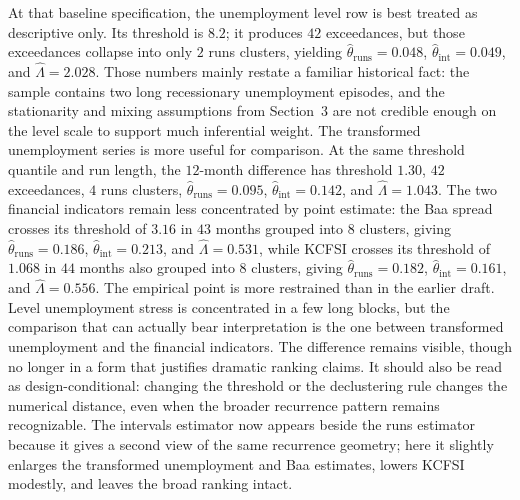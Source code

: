 \documentclass[11pt]{article}
\begin{document}
At that baseline specification, the unemployment level row is best treated as descriptive only. Its threshold is $8.2$; it produces $42$ exceedances, but those exceedances collapse into only $2$ runs clusters, yielding $\widehat{\theta}_{\mathrm{runs}}=0.048$, $\widehat{\theta}_{\mathrm{int}}=0.049$, and $\widehat{\Lambda}=2.028$. Those numbers mainly restate a familiar historical fact: the sample contains two long recessionary unemployment episodes, and the stationarity and mixing assumptions from Section~3 are not credible enough on the level scale to support much inferential weight. The transformed unemployment series is more useful for comparison. At the same threshold quantile and run length, the $12$-month difference has threshold $1.30$, $42$ exceedances, $4$ runs clusters, $\widehat{\theta}_{\mathrm{runs}}=0.095$, $\widehat{\theta}_{\mathrm{int}}=0.142$, and $\widehat{\Lambda}=1.043$. The two financial indicators remain less concentrated by point estimate: the Baa spread crosses its threshold of $3.16$ in $43$ months grouped into $8$ clusters, giving $\widehat{\theta}_{\mathrm{runs}}=0.186$, $\widehat{\theta}_{\mathrm{int}}=0.213$, and $\widehat{\Lambda}=0.531$, while KCFSI crosses its threshold of $1.068$ in $44$ months also grouped into $8$ clusters, giving $\widehat{\theta}_{\mathrm{runs}}=0.182$, $\widehat{\theta}_{\mathrm{int}}=0.161$, and $\widehat{\Lambda}=0.556$. The empirical point is more restrained than in the earlier draft. Level unemployment stress is concentrated in a few long blocks, but the comparison that can actually bear interpretation is the one between transformed unemployment and the financial indicators. The difference remains visible, though no longer in a form that justifies dramatic ranking claims. It should also be read as design-conditional: changing the threshold or the declustering rule changes the numerical distance, even when the broader recurrence pattern remains recognizable. The intervals estimator now appears beside the runs estimator because it gives a second view of the same recurrence geometry; here it slightly enlarges the transformed unemployment and Baa estimates, lowers KCFSI modestly, and leaves the broad ranking intact.
\end{document}
